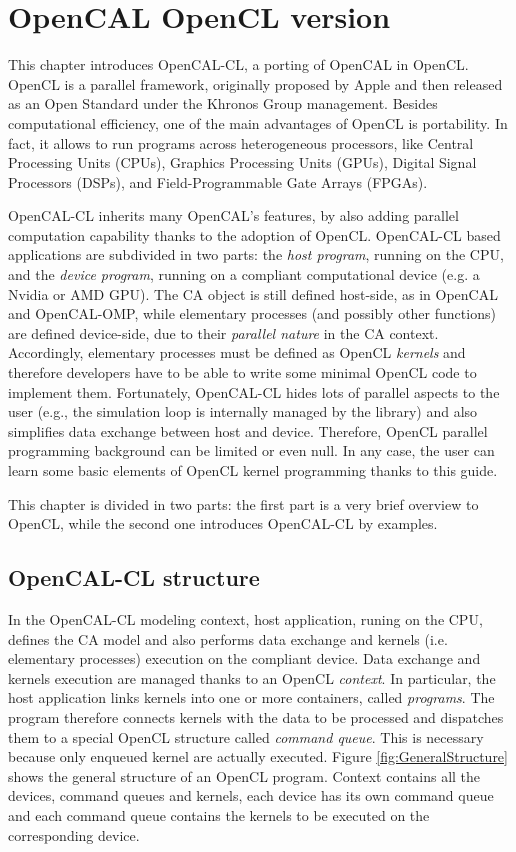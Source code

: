\chapter{OpenCAL OpenCL version}\label{ch:opencal-cl}


This chapter introduces OpenCAL-CL, a porting of OpenCAL in
OpenCL. OpenCL is a parallel framework, originally proposed by Apple
and then released as an Open Standard under the Khronos Group
management. Besides computational efficiency, one of the main
advantages of OpenCL is portability. In fact, it allows to run
programs across heterogeneous processors, like Central Processing Units
(CPUs), Graphics Processing Units (GPUs), Digital Signal Processors
(DSPs), and Field-Programmable Gate Arrays (FPGAs).

OpenCAL-CL inherits many OpenCAL's features, by also adding parallel
computation capability thanks to the adoption of OpenCL. OpenCAL-CL
based applications are subdivided in two parts: the \emph{host
  program}, running on the CPU, and the \emph{device program}, running
on a compliant computational device (e.g. a Nvidia or AMD GPU). The CA
object is still defined host-side, as in OpenCAL and OpenCAL-OMP,
while elementary processes (and possibly other functions) are defined
device-side, due to their \textsl{parallel nature} in the CA
context. Accordingly, elementary processes must be defined as OpenCL
\emph{kernels} and therefore developers have to be able to write some
minimal OpenCL code to implement them. Fortunately, OpenCAL-CL hides
lots of parallel aspects to the user (e.g., the simulation loop is
internally managed by the library) and also simplifies data exchange
between host and device. Therefore, OpenCL parallel programming
background can be limited or even null. In any case, the user can
learn some basic elements of OpenCL kernel programming thanks to this
guide.

This chapter is divided in two parts: the first part is a very brief
overview to OpenCL, while the second one introduces OpenCAL-CL by
examples.

\section{OpenCAL-CL structure}\label{sec:opencalclstructure}
In the OpenCAL-CL modeling context, host application, runing on the
CPU, defines the CA model and also performs data exchange and kernels
(i.e. elementary processes) execution on the compliant device. Data
exchange and kernels execution are managed thanks to an OpenCL
\emph{context}. In particular, the host application links kernels into
one or more containers, called \emph{programs}. The program therefore
connects kernels with the data to be processed and dispatches them to
a special OpenCL structure called \emph{command queue}. This is
necessary because only enqueued kernel are actually executed. Figure
\ref{fig:GeneralStructure} shows the general structure of an OpenCL
program. Context contains all the devices, command queues and kernels,
each device has its own command queue and each command queue contains
the kernels to be executed on the corresponding device.

